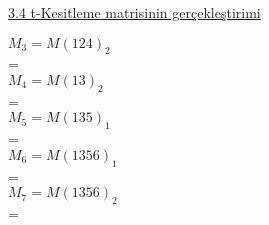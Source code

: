 \documentclass[11pt]{amsbook}
\begin{document}

\underline{3.4 t-Kesitleme matrisinin gerçekleştirimi}

\newline

$M_{3} = M(124)_{2}$\\
\newline
= \\
\newline
\newline
$M_{4} = M(13)_{2}$\\
\newline
= \\
\newline
\newline
$M_{5} = M(135)_{1}$\\
\newline
= \\
\newline\newline
$M_{6} = M(1356)_{1}$\\
\newline
= \\
\newline\newline
$M_{7} = M(1356)_{2}$\\
\newline
= \\
\end{document}
